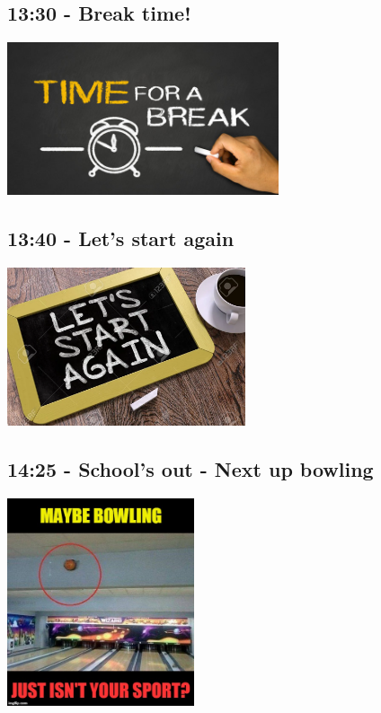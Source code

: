\documentclass[12pt,notes]{beamer}
\begin{document}
\begin{frame}[label={sec:org4fc9927}]{}
\section{13:30 - Break time!}

\begin{center}
\includegraphics[width=8cm]{./img/time_for_a_break.jpg}
\end{center}
\end{frame}

\begin{frame}[label={sec:org2e92016}]{}
\section{13:40 - Let's start again}
\begin{center}
\includegraphics[width=7cm]{./img/start_again.png}
\end{center}
\end{frame}

\begin{frame}[label={sec:org9769178}]{}
\section{14:25 - School's out - Next up bowling}

\begin{center}
\includegraphics[width=5.5cm]{./img/bowling.jpeg}
\end{center}
\end{frame}
\end{document}
